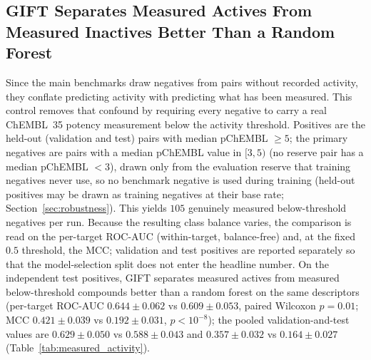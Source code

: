 \documentclass[11pt,letterpaper]{article}
\begin{document}
\subsection{GIFT Separates Measured Actives From Measured Inactives Better Than a Random Forest}
\label{sec:measured_activity}
Since the main benchmarks draw negatives from pairs without recorded activity, they conflate predicting activity with predicting what has been measured. This control removes that confound by requiring every negative to carry a real ChEMBL~35 potency measurement below the activity threshold. Positives are the held-out (validation and test) pairs with median pChEMBL $\geq 5$; the primary negatives are pairs with a median pChEMBL value in $[3,5)$ (no reserve pair has a median pChEMBL $<3$), drawn only from the evaluation reserve that training negatives never use, so no benchmark negative is used during training (held-out positives may be drawn as training negatives at their base rate; Section~\ref{sec:robustness}). This yields $105$ genuinely measured below-threshold negatives per run. Because the resulting class balance varies, the comparison is read on the per-target ROC-AUC (within-target, balance-free) and, at the fixed $0.5$ threshold, the MCC; validation and test positives are reported separately so that the model-selection split does not enter the headline number. On the independent test positives, GIFT separates measured actives from measured below-threshold compounds better than a random forest on the same descriptors (per-target ROC-AUC $0.644\pm0.062$ vs $0.609\pm0.053$, paired Wilcoxon $p=0.01$; MCC $0.421\pm0.039$ vs $0.192\pm0.031$, $p<10^{-8}$); the pooled validation-and-test values are $0.629\pm0.050$ vs $0.588\pm0.043$ and $0.357\pm0.032$ vs $0.164\pm0.027$ (Table~\ref{tab:measured_activity}).
\end{document}
